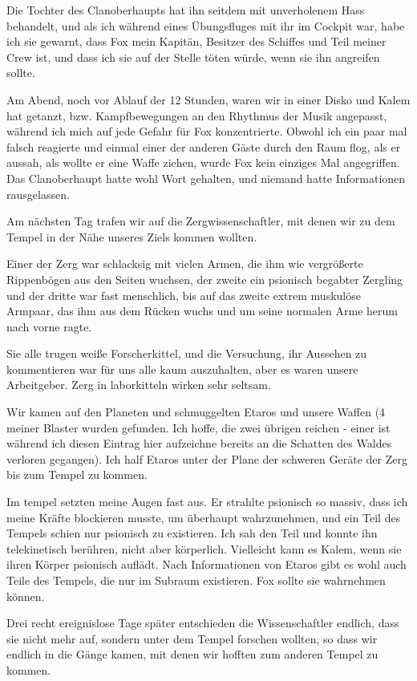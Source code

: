 \documentclass[11pt]{scrartcl}
\begin{document}
Die Tochter des Clanoberhaupts hat ihn seitdem mit unverholenem Hass
behandelt, und als ich während eines Übungsfluges mit ihr im Cockpit
war, habe ich sie gewarnt, dass Fox mein Kapitän, Besitzer des Schiffes
und Teil meiner Crew ist, und dass ich sie auf der Stelle töten würde,
wenn sie ihn angreifen sollte.

Am Abend, noch vor Ablauf der 12 Stunden, waren wir in einer Disko und
Kalem hat getanzt, bzw. Kampfbewegungen an den Rhythmus der Musik
angepasst, während ich mich auf jede Gefahr für Fox konzentrierte.
Obwohl ich ein paar mal falsch reagierte und einmal einer der anderen
Gäste durch den Raum flog, als er aussah, als wollte er eine Waffe
ziehen, wurde Fox kein einziges Mal angegriffen. Das Clanoberhaupt hatte
wohl Wort gehalten, und niemand hatte Informationen rausgelassen.

Am nächsten Tag trafen wir auf die Zergwissenschaftler, mit denen wir zu
dem Tempel in der Nähe unseres Ziels kommen wollten.

Einer der Zerg war schlacksig mit vielen Armen, die ihm wie vergrößerte
Rippenbögen aus den Seiten wuchsen, der zweite ein psionisch begabter
Zergling und der dritte war fast menschlich, bis auf das zweite extrem
muskulöse Armpaar, das ihm aus dem Rücken wuchs und um seine normalen
Arme herum nach vorne ragte.

Sie alle trugen weiße Forscherkittel, und die Versuchung, ihr Aussehen
zu kommentieren war für uns alle kaum auszuhalten, aber es waren unsere
Arbeitgeber. Zerg in laborkitteln wirken sehr seltsam.

Wir kamen auf den Planeten und schmuggelten Etaros und unsere Waffen (4
meiner Blaster wurden gefunden. Ich hoffe, die zwei übrigen reichen -
einer ist während ich diesen Eintrag hier aufzeichne bereits an die
Schatten des Waldes verloren gegangen). Ich half Etaros unter der Plane
der schweren Geräte der Zerg bis zum Tempel zu kommen.

Im tempel setzten meine Augen fast aus. Er strahlte psionisch so massiv,
dass ich meine Kräfte blockieren musste, um überhaupt wahrzunehmen, und
ein Teil des Tempels schien nur psionisch zu existieren. Ich sah den
Teil und konnte ihn telekinetisch berühren, nicht aber körperlich.
Vielleicht kann es Kalem, wenn sie ihren Körper psionisch auflädt. Nach
Informationen von Etaros gibt es wohl auch Teile des Tempels, die nur im
Subraum existieren. Fox sollte sie wahrnehmen können.

Drei recht ereignislose Tage später entschieden die Wissenschaftler
endlich, dass sie nicht mehr auf, sondern unter dem Tempel forschen
wollten, so dass wir endlich in die Gänge kamen, mit denen wir hofften
zum anderen Tempel zu kommen.
\end{document}
